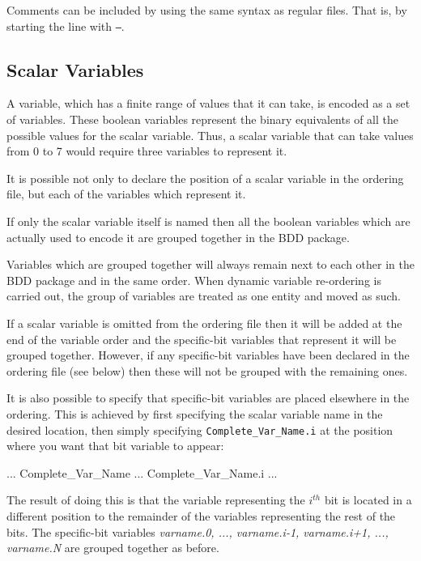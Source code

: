 Comments can be included by using the same syntax as regular \nusmv
files. That is, by starting the line with \texttt{--}.


\subsection{Scalar Variables}
\label{Scalar Variables}
%
A variable, which has a finite range of values that it can take, is
encoded as a set of \Boolean variables. These boolean variables
represent the binary equivalents of all the possible values for the
scalar variable. Thus, a scalar variable that can take values from 0
to 7 would require three \Boolean variables to represent it.

It is possible not only to declare the position of a scalar variable
in the ordering file, but each of the \Boolean variables which
represent it.

\noindent If only the scalar variable itself is named then all the
boolean variables which are actually used to encode it are grouped
together in the BDD package.

\noindent Variables which are grouped together will always remain next
to each other in the BDD package and in the same order. 
%
When dynamic variable re-ordering is carried out, the group of
variables are treated as one entity and moved as such.

\noindent If a scalar variable is omitted from the ordering file then
it will be added at the end of the variable order and the specific-bit
variables that represent it will be grouped together. 
%
However, if any specific-bit variables have been declared in the
ordering file (see below) then these will not be grouped with the
remaining ones.

\noindent It is also possible to specify that specific-bit variables
are placed elsewhere in the ordering. 
%
This is achieved by first specifying the scalar variable name in the
desired location, then simply specifying
\texttt{Complete\_Var\_Name.i} at the position where you want that bit
variable to appear:
%
\begin{Grammar}
...
Complete\_Var\_Name
...
Complete\_Var\_Name.i
...
\end{Grammar}
%
The result of doing this is that the variable representing the
\textit{$i^{th}$} bit is located in a different position to the
remainder of the variables representing the rest of the bits. 
%
The specific-bit variables \textit{varname.0, ..., varname.i-1,
varname.i+1, ..., varname.N} are grouped together as before.

